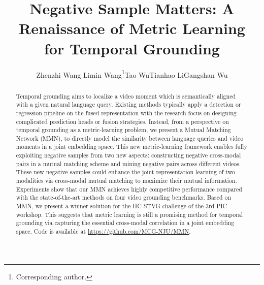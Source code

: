\documentclass[letterpaper]{article} \usepackage{aaai22}  \usepackage{times}  \usepackage{helvet}  \usepackage{courier}  \usepackage[hyphens]{url}  \usepackage{graphicx} \urlstyle{rm} \def\UrlFont{\rm}  \usepackage{natbib}  \usepackage{caption} \DeclareCaptionStyle{ruled}{labelfont=normalfont,labelsep=colon,strut=off} \frenchspacing  \setlength{\pdfpagewidth}{8.5in}  \setlength{\pdfpageheight}{11in}  \usepackage{algorithm}
\title{Negative Sample Matters: A Renaissance of Metric Learning \\ for Temporal Grounding}
\author{Zhenzhi Wang \quad Limin Wang\thanks{Corresponding author.}\quad Tao Wu\quad  Tianhao Li\quad Gangshan Wu}
\begin{document}
\maketitle

\begin{abstract}
Temporal grounding aims to localize a video moment which is semantically aligned with a given natural language query. Existing methods typically apply a detection or regression pipeline on the fused representation with the research focus on designing complicated prediction heads or fusion strategies. Instead, from a perspective on temporal grounding as a metric-learning problem, we present a Mutual Matching Network (MMN), to directly model the similarity between language queries and video moments in a joint embedding space. This new metric-learning framework enables fully exploiting negative samples from two new aspects: constructing negative cross-modal pairs in a mutual matching scheme and mining negative pairs across different videos. These new negative samples could enhance the joint representation learning of two modalities via cross-modal mutual matching to maximize their mutual information. Experiments show that our MMN achieves highly competitive performance compared with the state-of-the-art methods on four video grounding benchmarks. Based on MMN, we present a winner solution for the HC-STVG challenge of the 3rd PIC workshop. This suggests that metric learning is still a promising method for temporal grounding via capturing the essential cross-modal correlation in a joint embedding space. Code is available at \url{https://github.com/MCG-NJU/MMN}.
\end{abstract}
\end{document}
